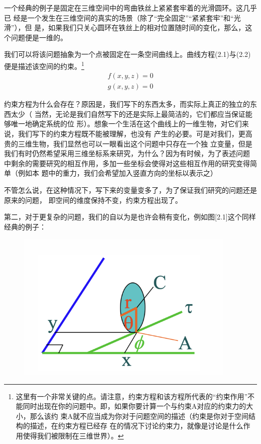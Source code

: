 \documentclass[a4paper, 10pt, openany]{book}%
\begin{document}
一个经典的例子是固定在三维空间中的弯曲铁丝上紧紧套牢着的光滑圆环。这几乎已
经是一个发生在三维空间的真实的场景（除了“完全固定”“紧紧套牢”和“光滑”），但
是，如果我们只关心圆环在铁丝上的相对位置随时间的变化，那么，这个问题便是一维的。

我们可以将该问题抽象为一个点被固定在一条空间曲线上。曲线方程(2.1)与(2.2)便是描述该空间的约束。\footnote{这里有一个非常关键的点。请注意，约束方程和该方程所代表的“约束作用”不
能同时出现在你的问题中。即，如果你要计算一个与约束A对应的约束力的大小，那么该约
束A就不应当成为你对于问题空间的描述（约束是你对于空间结构的描述，在约束方程已经存
在的情况下讨论约束力，就像是讨论是什么作用使得我们被限制在三维世界）。}
\begin{align}
  f(x,y,z)=0 \\
  g(x,y,z)=0
\end{align}



约束方程为什么会存在？原因是，我们写下的东西太多，而实际上真正的独立的东西太少（
当然，无论是我们自然写下的还是实际上最简洁的，它们都应当保证能够唯一地确定系统的位
形）。想象一个生活在这个曲线上的一维生物，对它们来说，我们写下的约束方程既不能被理解，也没有
产生的必要。可是对我们，更高贵的三维生物，我们显然也可以一眼看出这个问题中只存在一个独
立变量，但是我们有时仍然希望采用三维坐标系来研究，为什么？因为有时候，为了表述问题
中剩余的需要研究的相互作用，多加一些坐标会使得对这些相互作用的研究变得简单（例如本
题中的重力，我们会希望加入竖直方向的坐标以表示之）

不管怎么说，在这种情况下，写下来的变量变多了，为了保证我们研究的问题还是原来的问题，
即空间的维度保持不变，约束方程出现了。



第二，对于更复杂的问题，我们的自以为是也许会稍有变化，例如图[2.1]这个同样经典的例子：
\begin{figure}[ht]
  \centering 
  \includegraphics[width=10.5cm]{2.png}
  \caption{}
  \end{figure}
\end{document}
